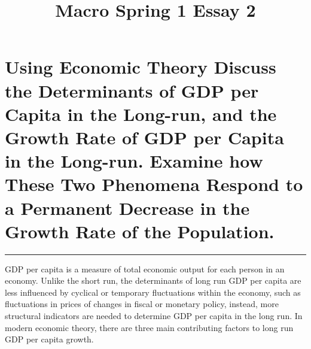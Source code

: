\documentclass[
]{article}
\title{Macro Spring 1 Essay 2}
\author{}
\date{}
\begin{document}
\maketitle

\hypertarget{using-economic-theory-discuss-the-determinants-of-gdp-per-capita-in-the-long-run-and-the-growth-rate-of-gdp-per-capita-in-the-long-run.-examine-how-these-two-phenomena-respond-to-a-permanent-decrease-in-the-growth-rate-of-the-population.}{%
\section{Using Economic Theory Discuss the Determinants of GDP per
Capita in the Long-run, and the Growth Rate of GDP per Capita in the
Long-run. Examine how These Two Phenomena Respond to a Permanent
Decrease in the Growth Rate of the
Population.}\label{using-economic-theory-discuss-the-determinants-of-gdp-per-capita-in-the-long-run-and-the-growth-rate-of-gdp-per-capita-in-the-long-run.-examine-how-these-two-phenomena-respond-to-a-permanent-decrease-in-the-growth-rate-of-the-population.}}

\begin{center}\rule{0.5\linewidth}{0.5pt}\end{center}

GDP per capita is a measure of total economic output for each person in
an economy. Unlike the short run, the determinants of long run GDP per
capita are less influenced by cyclical or temporary fluctuations within
the economy, such as fluctuations in prices of changes in fiscal or
monetary policy, instead, more structural indicators are needed to
determine GDP per capita in the long run. In modern economic theory,
there are three main contributing factors to long run GDP per capita
growth.
\end{document}
